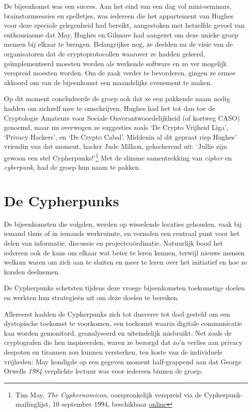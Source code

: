 \documentclass[
  a5paper,
  smalldemyvopaper,11pt,twoside,onecolumn,openright,extrafontsizes,
hidelinks]{memoir}
\begin{document}
De bijeenkomst was een succes. Aan het eind van een dag vol
mini-seminars, brainstormsessies en spelletjes, was iedereen die het
appartement van Hughes voor deze speciale gelegenheid had bereikt,
aangestoken met hetzelfde gevoel van enthousiasme dat May, Hughes en
Gilmore had aangezet om deze unieke groep mensen bij elkaar te brengen.
Belangrijker nog, ze deelden nu de visie van de organisatoren dat de
cryptoprotocollen waarover ze hadden geleerd, geïmplementeerd moesten
worden als werkende software en zo ver mogelijk verspreid moesten
worden. Om de zaak verder te bevorderen, gingen ze ermee akkoord om van
de bijeenkomst een maandelijks evenement te maken.

Op dit moment concludeerde de groep ook dat ze een pakkende naam nodig
hadden om zichzelf mee te omschrijven. Hughes had het tot dan toe de
Cryptologie Amateurs voor Sociale Onverantwoordelijkheid (of kortweg
CASO) genoemd, maar nu overwogen ze suggesties zoals `De Crypto Vrijheid
Liga', `Privacy Hackers', en `De Crypto Cabal'. Middenin al dit gepraat
riep Hughes' vriendin van dat moment, hacker Jude Milhon, gekscherend
uit: `Jullie zijn gewoon een stel Cypherpunks!'\footnote{Tim May,
  \emph{The Cyphernomicon}, oorspronkelijk verspreid via de
  Cypherpunk-mailinglijst, 10 september 1994, beschikbaar
  \href{https://cdn.nakamotoinstitute.org/docs/cyphernomicon.txt}{online}}
Met de slimme samentrekking van \emph{cipher} en \emph{cyberpunk}, had
de groep hun naam te pakken.

\section{De Cypherpunks}\label{de-cypherpunks}

De bijeenkomsten die volgden, werden op wisselende locaties gehouden,
vaak bij iemand thuis of in iemands werkruimte, en vormden een centraal
punt voor het delen van informatie, discussie en projectcoördinatie.
Natuurlijk bood het iedereen ook de kans om elkaar wat beter te leren
kennen, terwijl nieuwe mensen welkom waren om zich aan te sluiten en
meer te leren over het initiatief en hoe ze konden deelnemen.

De Cypherpunks schetsten tijdens deze vroege bijeenkomsten toekomstige
doelen en werkten hun strategieën uit om deze doelen te bereiken.

Allereerst hadden de Cypherpunks zich tot dusverre tot doel gesteld om
een dystopische toekomst te voorkomen, een toekomst waarin digitale
communicatie kan worden gemonitord, geanalyseerd en uiteindelijk
misbruikt. Net zoals de cryptografen die hen inspireerden, waren ze
bezorgd dat zo'n verlies aan privacy despoten en tirannen zou kunnen
versterken, ten koste van de individuele vrijheden: May kondigde op een
gegeven moment half-grappend aan dat George Orwells \emph{1984}
verplichte lectuur was voor iedereen binnen de groep.
\end{document}

